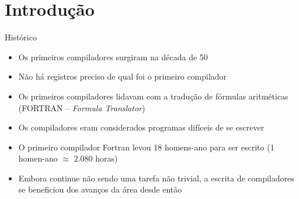 \section{Introdução}

\begin{frame}[fragile]{Histórico}

    \begin{itemize}
        \item Os primeiros compiladores surgiram na década de 50

        \item Não há registros preciso de qual foi o primeiro compilador

        \item Os primeiros compiladores lidavam com a tradução de fórmulas aritméticas (FORTRAN -- \textit{Formula Translator})

        \item Os compiladores eram considerados programas difíceis de se escrever

        \item O primeiro compilador Fortran levou 18 homens-ano para ser escrito (1 homen-ano $\approx$ 2.080 horas)

        \item Embora continue não sendo uma tarefa não trivial, a escrita de compiladores se beneficiou dos avanços da área desde então
    \end{itemize}

\end{frame}


